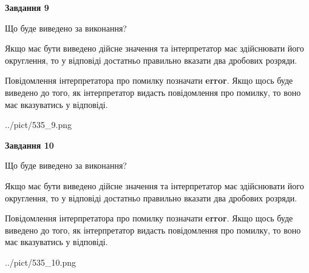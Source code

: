 \documentclass[12pt, ukrainian]{article}
\begin{document}
{\begin {Large}
{\begin {center}\textbf{Завдання 9}\end {center}}\par
Що буде виведено за виконання? \par

Якщо має бути виведено дійсне значення та інтерпретатор має здійснювати його округлення, 
то у відповіді достатньо правильно вказати два дробових розряди.

Повідомлення інтерпретатора про помилку позначати \textbf{error}.
Якщо щось буде виведено до того, як інтерпретатор видасть повідомлення про помилку, 
то воно має вказуватись у відповіді. \par

\begin{center}
	{../pict/535_9.png}
\end{center}
\newpage

{\begin {center}\textbf{Завдання 10}\end {center}}\par
Що буде виведено за виконання? \par

Якщо має бути виведено дійсне значення та інтерпретатор має здійснювати його округлення, 
то у відповіді достатньо правильно вказати два дробових розряди.

Повідомлення інтерпретатора про помилку позначати \textbf{error}.
Якщо щось буде виведено до того, як інтерпретатор видасть повідомлення про помилку, 
то воно має вказуватись у відповіді. \par

\begin{center}
	{../pict/535_10.png}
\end{center}
\newpage

\end {Large}}
\end{document}
